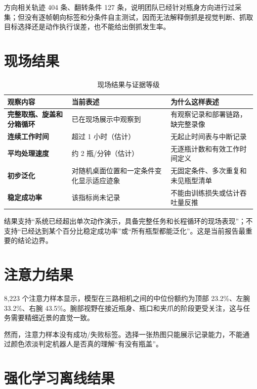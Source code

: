 方向相关轨迹 404 条、翻转条件 127 条，说明团队已经针对瓶身方向进行过采集；但没有逐帧朝向标签和分条件自主测试，因而无法解释倒抓是视觉判断、抓取目标选择还是动作执行误差，也不能给出倒抓发生率。

\section{现场结果}

\begin{table}[H]
\centering
\caption{现场结果与证据等级}
\begin{tabularx}{\textwidth}{>{\bfseries}p{42mm}p{34mm}X}
\toprule
观察内容 & 当前表述 & 为什么这样表述\\
\midrule
完整取瓶、旋盖和分箱循环 & 已在现场展示中观察到 & 有观察记录和部署链路，缺完整录像\\
连续工作时间 & 超过 1 小时（估计） & 无起止时间表与中断记录\\
平均处理速度 & 约 2 瓶/分钟（估计） & 无逐瓶计数和有效工作时间定义\\
初步泛化 & 对随机桌面位置和一定条件变化显示适应迹象 & 无固定条件、多次重复和未见瓶型清单\\
稳定成功率 & 该指标尚未记录 & 不能由训练损失或估计吞吐量反推\\
\bottomrule
\end{tabularx}
\end{table}

结果支持“系统已经超出单次动作演示，具备完整任务和长程循环的现场表现”；不支持“已经达到某个百分比稳定成功率”或“所有瓶型都能泛化”。这是当前报告最重要的结论边界。

\section{注意力结果}

8,223 个注意力样本显示，模型在三路相机之间的中位份额约为顶部 23.2\%、左腕 33.2\%、右腕 43.5\%。腕部视野在接近瓶身、瓶口和夹爪的阶段更受关注，这与任务需要精细近景的直觉一致。

然而，注意力样本没有成功/失败标签。选择一张热图只能展示记录能力，不能通过颜色浓淡判定机器人是否真的理解“有没有瓶盖”。

\section{强化学习离线结果}


